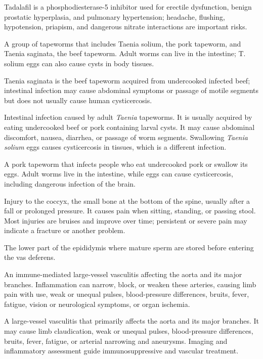  Tadalafil is a phosphodiesterase-5 inhibitor used for erectile dysfunction, benign prostatic hyperplasia, and pulmonary hypertension; headache, flushing, hypotension, priapism, and dangerous nitrate interactions are important risks.

 A group of tapeworms that includes Taenia solium, the pork tapeworm, and Taenia saginata, the beef tapeworm. Adult worms can live in the intestine; T. solium eggs can also cause cysts in body tissues.

 Taenia saginata is the beef tapeworm acquired from undercooked infected beef; intestinal infection may cause abdominal symptoms or passage of motile segments but does not usually cause human cysticercosis.

 Intestinal infection caused by adult \textit{Taenia} tapeworms. It is usually acquired by eating undercooked beef or pork containing larval cysts. It may cause abdominal discomfort, nausea, diarrhea, or passage of worm segments. Swallowing \textit{Taenia solium} eggs causes cysticercosis in tissues, which is a different infection.

 A pork tapeworm that infects people who eat undercooked pork or swallow its eggs. Adult worms live in the intestine, while eggs can cause cysticercosis, including dangerous infection of the brain.

 Injury to the coccyx, the small bone at the bottom of the spine, usually after a fall or prolonged pressure. It causes pain when sitting, standing, or passing stool. Most injuries are bruises and improve over time; persistent or severe pain may indicate a fracture or another problem.

 The lower part of the epididymis where mature sperm are stored before entering the vas deferens.

 An immune-mediated large-vessel vasculitis affecting the aorta and its major branches. Inflammation can narrow, block, or weaken these arteries, causing limb pain with use, weak or unequal pulses, blood-pressure differences, bruits, fever, fatigue, vision or neurological symptoms, or organ ischemia.

 A large-vessel vasculitis that primarily affects the aorta and its major branches. It may cause limb claudication,
weak or unequal pulses, blood-pressure differences, bruits, fever, fatigue, or arterial narrowing and aneurysms.
Imaging and inflammatory assessment guide immunosuppressive and vascular treatment.

